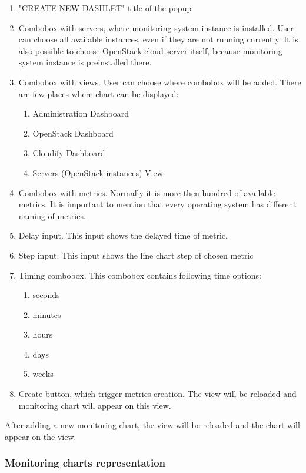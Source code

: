 \begin{enumerate}
\item "CREATE NEW DASHLET" title of the popup
\item Combobox with servers, where monitoring system instance is installed. User can choose all available instances, even if they are not running currently. It is also possible to choose OpenStack cloud server itself, because monitoring system instance is preinstalled there.
\item Combobox with views.  User can choose where combobox will be added. There are few places where chart can be displayed:
\begin{enumerate}
\item Administration Dashboard
\item OpenStack Dashboard
\item Cloudify Dashboard
\item Servers (OpenStack instances) View. 
\end{enumerate}
\item Combobox with metrics. Normally it is more then hundred of available metrics. It is important to mention that every operating system has different naming of metrics.
\item Delay input. This input shows the delayed time of metric.
\item Step input. This input shows the line chart step of chosen metric
\item Timing combobox. This combobox contains following time options:
\begin{enumerate}
\item seconds
\item minutes
\item hours
\item days
\item weeks
\end{enumerate}
\item Create button, which trigger metrics creation. The view will be reloaded and monitoring chart will appear on this view.
\end{enumerate}

After adding a new monitoring chart, the view will be reloaded and the chart will appear on the view. 

\subsubsection{Monitoring charts representation}\label{Monitoring chart representation}


